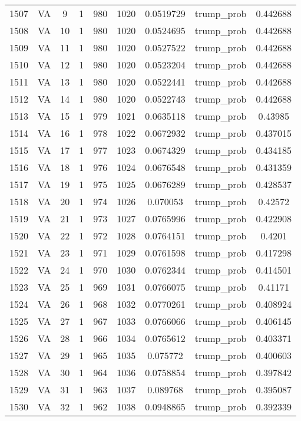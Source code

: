 \documentclass[12pt,a4paper]{article}
\begin{document}
\begin{tabular}{r|cccccccc}
	1507 & VA & 9 & 1 & 980 & 1020 & 0.0519729 & trump\_prob & 0.442688 \\
	1508 & VA & 10 & 1 & 980 & 1020 & 0.0524695 & trump\_prob & 0.442688 \\
	1509 & VA & 11 & 1 & 980 & 1020 & 0.0527522 & trump\_prob & 0.442688 \\
	1510 & VA & 12 & 1 & 980 & 1020 & 0.0523204 & trump\_prob & 0.442688 \\
	1511 & VA & 13 & 1 & 980 & 1020 & 0.0522441 & trump\_prob & 0.442688 \\
	1512 & VA & 14 & 1 & 980 & 1020 & 0.0522743 & trump\_prob & 0.442688 \\
	1513 & VA & 15 & 1 & 979 & 1021 & 0.0635118 & trump\_prob & 0.43985 \\
	1514 & VA & 16 & 1 & 978 & 1022 & 0.0672932 & trump\_prob & 0.437015 \\
	1515 & VA & 17 & 1 & 977 & 1023 & 0.0674329 & trump\_prob & 0.434185 \\
	1516 & VA & 18 & 1 & 976 & 1024 & 0.0676548 & trump\_prob & 0.431359 \\
	1517 & VA & 19 & 1 & 975 & 1025 & 0.0676289 & trump\_prob & 0.428537 \\
	1518 & VA & 20 & 1 & 974 & 1026 & 0.070053 & trump\_prob & 0.42572 \\
	1519 & VA & 21 & 1 & 973 & 1027 & 0.0765996 & trump\_prob & 0.422908 \\
	1520 & VA & 22 & 1 & 972 & 1028 & 0.0764151 & trump\_prob & 0.4201 \\
	1521 & VA & 23 & 1 & 971 & 1029 & 0.0761598 & trump\_prob & 0.417298 \\
	1522 & VA & 24 & 1 & 970 & 1030 & 0.0762344 & trump\_prob & 0.414501 \\
	1523 & VA & 25 & 1 & 969 & 1031 & 0.0766075 & trump\_prob & 0.41171 \\
	1524 & VA & 26 & 1 & 968 & 1032 & 0.0770261 & trump\_prob & 0.408924 \\
	1525 & VA & 27 & 1 & 967 & 1033 & 0.0766066 & trump\_prob & 0.406145 \\
	1526 & VA & 28 & 1 & 966 & 1034 & 0.0765612 & trump\_prob & 0.403371 \\
	1527 & VA & 29 & 1 & 965 & 1035 & 0.075772 & trump\_prob & 0.400603 \\
	1528 & VA & 30 & 1 & 964 & 1036 & 0.0758854 & trump\_prob & 0.397842 \\
	1529 & VA & 31 & 1 & 963 & 1037 & 0.089768 & trump\_prob & 0.395087 \\
	1530 & VA & 32 & 1 & 962 & 1038 & 0.0948865 & trump\_prob & 0.392339 \\

\end{tabular}
\end{document}
